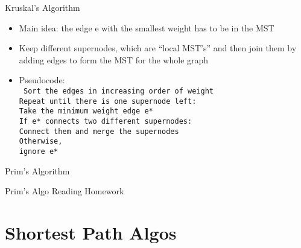 \documentclass{beamer}
\begin{document}
\begin{frame}[<+->]{Kruskal's Algorithm}
\begin{block}{}
  \begin{itemize}
    \item Main idea: the edge e with the smallest weight has to be in the MST
    \item Keep different supernodes, which are “local MST’s” and then join them by adding edges to form the MST for the whole graph
    \item Pseudocode:\\
      \tt{\hspace{3mm} Sort the edges in increasing order of weight\\
      \hspace{3mm} Repeat until there is one supernode left:\\
	\hspace{6mm} Take the minimum weight edge e*\\
	\hspace{6mm} If e* connects two different supernodes:\\
	  \hspace{9mm} Connect them and merge the supernodes\\
	\hspace{6mm} Otherwise,\\
	  \hspace{9mm} ignore e*}
  \end{itemize}
\end{block}
\end{frame}

\begin{frame}[<+->]{Prim's Algorithm}
\begin{block}{Prim's Algo}
  Reading Homework
\end{block}
\end{frame}

\section{Shortest Path Algos}
\end{document}

